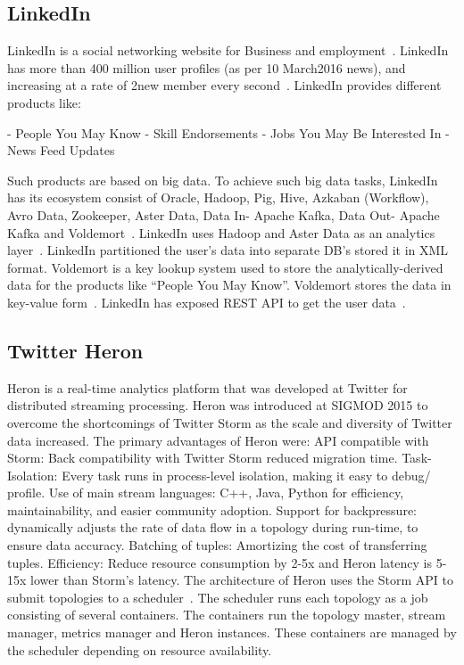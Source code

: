      \pv

\subsection{LinkedIn}
     
LinkedIn is a social networking website for Business and
employment~\cite{www-linkedinwiki}. LinkedIn has more than 400 million
user profiles (as per 10 March2016 news), and increasing at a rate of
2new member every second~\cite{www-linkedinbigdata}.  LinkedIn
provides different products like:

     - People You May Know
     - Skill Endorsements
     - Jobs You May Be Interested In
     - News Feed Updates

     Such products are based on big data. To achieve such big data
     tasks, LinkedIn has its ecosystem consist of Oracle, Hadoop, Pig,
     Hive, Azkaban (Workflow), Avro Data, Zookeeper, Aster Data, Data
     In- Apache Kafka, Data Out- Apache Kafka and
     Voldemort~\cite{www-linkedinbigdata}. LinkedIn uses Hadoop and
     Aster Data as an analytics
     layer~\cite{www-linkedinquora}. LinkedIn partitioned the user's
     data into separate DB's stored it in XML format. Voldemort is a
     key lookup system used to store the analytically-derived data for
     the products like ``People You May Know''. Voldemort stores the
     data in key-value form~\cite{www-linkedinquora}. LinkedIn has
     exposed REST API to get the user
     data~\cite{www-linkedindevelopers}.

\subsection{Twitter Heron \cv}

Heron is a real-time analytics platform that was developed at Twitter
for distributed streaming processing. Heron was introduced at SIGMOD
2015 to overcome the shortcomings of Twitter Storm as the scale and
diversity of Twitter data increased.  The primary advantages of Heron
were: API compatible with Storm: Back compatibility with Twitter Storm
reduced migration time\cite{www-TwitterHeronOpen}.  Task-Isolation:
Every task runs in process-level isolation, making it easy to debug/
profile. Use of main stream languages: C++, Java, Python for
efficiency, maintainability, and easier community adoption. Support
for backpressure: dynamically adjusts the rate of data flow in a
topology during run-time, to ensure data accuracy. Batching of tuples:
Amortizing the cost of transferring tuples. Efficiency: Reduce
resource consumption by 2-5x and Heron latency is 5-15x lower than
Storm's latency. The architecture of Heron uses the Storm API to
submit topologies to a scheduler~\cite{www-TwitterHeron}.  The
scheduler runs each topology as a job consisting of several
containers. The containers run the topology master, stream manager,
metrics manager and Heron instances. These containers are managed by
the scheduler depending on resource availability.

